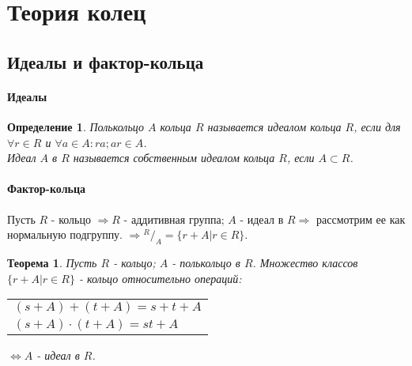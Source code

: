 \documentclass[10pt,a4paper]{article}
\newtheorem{definition}{Определение}
\newtheorem{theorem}{Теорема}
\begin{document}
	\setcounter{section}{1}
	\section{Теория колец}
		\setcounter{subsection}{2}
		\subsection{Идеалы и фактор-кольца}
			\paragraph{Идеалы}
				\begin{definition}
					Полькольцо $A$ кольца $R$ называется идеалом кольца $R$, если для $\forall r \in R$ и $\forall a \in A : ra; ar \in A$.\\
					Идеал $A$ в $R$ называется собственным идеалом кольца $R$, если $A \subset R$. 
				\end{definition}
			\paragraph{Фактор-кольца}
				Пусть  $R$ - кольцо $\Rightarrow R$ - аддитивная группа; $A$ - идеал в $R \Rightarrow$ рассмотрим ее как нормальную подгруппу.
				$\Rightarrow {}^R/_A = \{r + A | r \in R\}$.
				\begin{theorem}
					Пусть $R$ - кольцо; $A$ - полькольцо в $R$.
					Множество классов $\{r + A | r \in R\}$ - кольцо относительно операций:\\
					\begin{tabular}{l}
						$(s + A) + (t + A) = s + t + A$\\
						$(s + A) \cdot (t + A) = st + A$
					\end{tabular}
					$\Leftrightarrow A$ - идеал в $R$.
				\end{theorem}
\end{document}
